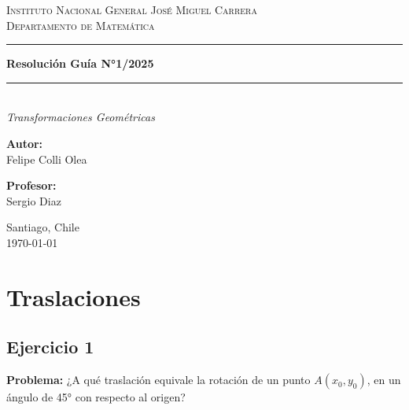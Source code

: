 \documentclass[12pt, letterpaper]{article}
\begin{document}
\pagestyle{fancy}
\fancyhf{}
\fancyfoot[C]{\footnotesize }
\fancyfoot[R]{\thepage}
\renewcommand{\headrulewidth}{0pt}

\begin{titlepage}
	\centering
	\textsc{\LARGE Instituto Nacional General José Miguel Carrera}\\[0.5cm]
	\textsc{\Large Departamento de Matemática}\\[1.5cm]
	\rule{\textwidth}{1.5pt}\vspace{0.4cm}
	{ \Huge \bfseries Resolución Guía N°1/2025}\\[0.4cm]
	\rule{\textwidth}{1.5pt}\\[1.5cm]
	{ \Large \textit{Transformaciones Geométricas} }\\[3cm]
	\begin{minipage}{0.45\textwidth}
		\begin{flushleft} \large
			\textbf{Autor:}\\
			Felipe Colli Olea\\
		\end{flushleft}
	\end{minipage}
	\hfill
	\begin{minipage}{0.45\textwidth}
		\begin{flushright} \large
			\textbf{Profesor:}\\
			Sergio Diaz
		\end{flushright}
	\end{minipage}
	\vfill
	{ \large Santiago, Chile \\[0.5cm] \today }
\end{titlepage}

\newpage
\tableofcontents
\newpage

\section{Traslaciones}
\thispagestyle{fancy}

\subsection{Ejercicio 1}
\textbf{Problema:} ¿A qué traslación equivale la rotación de un punto $A(x_0,y_0)$, en un ángulo de 45° con respecto al origen?
\end{document}
